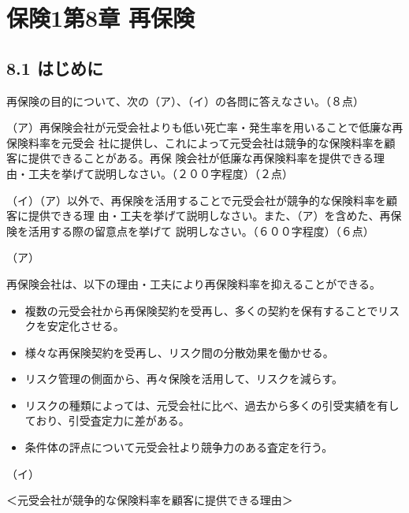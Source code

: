 \documentclass[report,gutter=10mm,fore-edge=10mm,uplatex,dvipdfmx]{jlreq}
\begin{document}
\chapter{保険1第8章 再保険}
\section{8.1 はじめに}
再保険の目的について、次の（ア）、（イ）の各問に答えなさい。（８点）

（ア）再保険会社が元受会社よりも低い死亡率・発生率を用いることで低廉な再保険料率を元受会
社に提供し、これによって元受会社は競争的な保険料率を顧客に提供できることがある。再保
険会社が低廉な再保険料率を提供できる理由・工夫を挙げて説明しなさい。（２００字程度）（２点）

（イ）（ア）以外で、再保険を活用することで元受会社が競争的な保険料率を顧客に提供できる理
由・工夫を挙げて説明しなさい。また、（ア）を含めた、再保険を活用する際の留意点を挙げて
説明しなさい。（６００字程度）（６点）

\answer{}
（ア）

再保険会社は、以下の理由・工夫により再保険料率を抑えることができる。
\begin{itemize}
\item[] 複数の元受会社から再保険契約を受再し、多くの契約を保有することでリスクを安定化させる。
\item[] 様々な再保険契約を受再し、リスク間の分散効果を働かせる。
\item[] リスク管理の側面から、再々保険を活用して、リスクを減らす。
\item[] リスクの種類によっては、元受会社に比べ、過去から多くの引受実績を有しており、引受査定力に差がある。
\item[] 条件体の評点について元受会社より競争力のある査定を行う。
\end{itemize}

（イ）

＜元受会社が競争的な保険料率を顧客に提供できる理由＞
\end{document}

